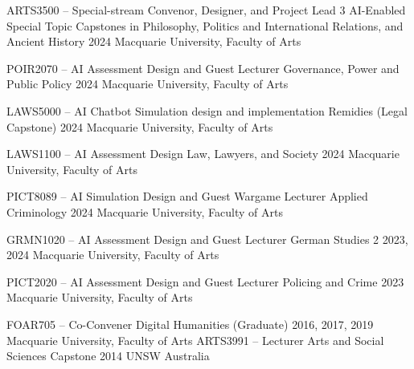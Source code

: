 \begin{cventries}

\cventry
    {ARTS3500 -- Special-stream Convenor, Designer, and Project Lead}
    {3 AI-Enabled Special Topic Capstones in Philosophy, Politics and International Relations, and Ancient History}
    {2024}
    {Macquarie University, Faculty of Arts}
    {}

\cventry
    {POIR2070 -- AI Assessment Design and Guest Lecturer}
    {Governance, Power and Public Policy}
    {2024}
    {Macquarie University, Faculty of Arts}
    {}

\cventry
    {LAWS5000 -- AI Chatbot Simulation design and implementation}
    {Remidies (Legal Capstone)}
    {2024}
    {Macquarie University, Faculty of Arts}
    {}


\cventry
    {LAWS1100 -- AI Assessment Design}
    {Law, Lawyers, and Society}
    {2024}
    {Macquarie University, Faculty of Arts}
    {}

\cventry
    {PICT8089 -- AI Simulation Design and Guest Wargame Lecturer}
    {Applied Criminology}
    {2024}
    {Macquarie University, Faculty of Arts}
    {}

\cventry
    {GRMN1020 -- AI Assessment Design and Guest Lecturer}
    {German Studies 2}
    {2023, 2024}
    {Macquarie University, Faculty of Arts}
    {}

\cventry
    {PICT2020 -- AI Assessment Design and Guest Lecturer}
    {Policing and Crime}
    {2023}
    {Macquarie University, Faculty of Arts}
    {}
\end{cventries}
\begin{cventries}

\cventry
    {FOAR705 -- Co-Convener}
    {Digital Humanities (Graduate)}
    {2016, 2017, 2019}
    {Macquarie University, Faculty of Arts}
    {}
\cventry
    {ARTS3991 -- Lecturer}
    {Arts and Social Sciences Capstone}
    {2014}
    {UNSW Australia}
    {}  

\end{cventries}





